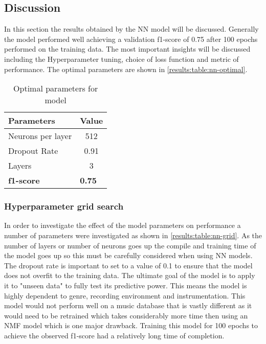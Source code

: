 \subsection{Discussion}
In this section the results obtained by the \ac{NN} model will be discussed.
Generally the model performed well achieving a validation f1-score of 0.75 after
100 epochs performed on the training data. The most important insights will be
discussed including the Hyperparameter tuning, choice of loss function and
metric of performance. The optimal parameters are shown in \autoref{results:table:nn-optimal}.


\begin{table}
    \centering
    \begin{tabular}{|l|c|}
        \hline
        \textbf{Parameters} & \multicolumn{1}{l|}{\textbf{Value}} \\ \hline
        Neurons per layer   & 512                                 \\ \hline
        Dropout Rate        & 0.91                                \\ \hline
        Layers              & 3                                   \\ \hline
        \textbf{f1-score}   & \multicolumn{1}{l|}{\textbf{0.75}}  \\ \hline
    \end{tabular}
    \caption{Optimal parameters for model}
    \label{results:table:nn-optimal}
\end{table}

\subsubsection{Hyperparameter grid search}
In order to investigate the effect of the model parameters on performance a
number of parameters were investigated as shown in
\autoref{results:table:nn-grid}. As the number of layers or number of neurons
goes up the compile and training time of the model goes up so this must be
carefully considered when using NN models. The dropout rate is important to set
to a value of 0.1 to ensure that the model does not overfit to the training
data. The ultimate goal of the model is to apply it to "unseen data" to fully
test its predictive power. This means the model is highly dependent to genre,
recording environment and instrumentation. This model would not perform well on
a music database that is vastly different as it would need to be retrained which
takes considerably more time then using an NMF model which is one major
drawback. Training this model for 100 epochs to achieve the observed f1-score
had a relatively long time of completion.

